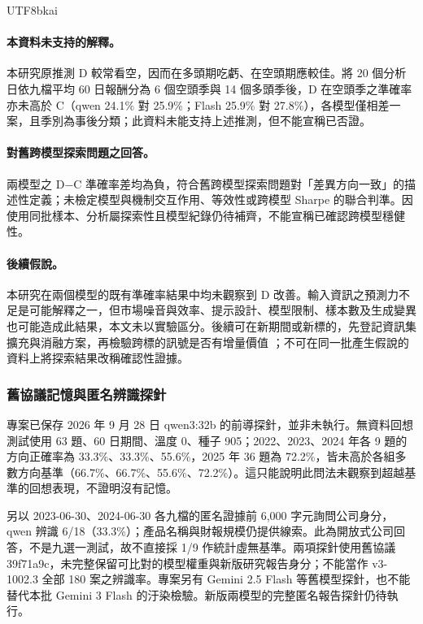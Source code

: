 \documentclass[12pt,a4paper]{article}
\newcommand{\grp}[1]{\textsf{#1}}
\begin{document}
\begin{CJK}{UTF8}{bkai}
\paragraph{本資料未支持的解釋。} 本研究原推測 \grp{D} 較常看空，因而在多頭期吃虧、在空頭期應較佳。將 20 個分析日依九檔平均 60 日報酬分為 6 個空頭季與 14 個多頭季後，\grp{D} 在空頭季之準確率亦未高於 \grp{C}（qwen 24.1\% 對 25.9\%；Flash 25.9\% 對 27.8\%），各模型僅相差一案，且季別為事後分類；此資料未能支持上述推測，但不能宣稱已否證。

\paragraph{對舊跨模型探索問題之回答。} 兩模型之 \grp{D}$-$\grp{C} 準確率差均為負，符合舊跨模型探索問題對「差異方向一致」的描述性定義；未檢定模型與機制交互作用、等效性或跨模型 Sharpe 的聯合判準。因使用同批樣本、分析屬探索性且模型紀錄仍待補齊，不能宣稱已確認跨模型穩健性。

\paragraph{後續假說。} 本研究在兩個模型的既有準確率結果中均未觀察到 \grp{D} 改善。輸入資訊之預測力不足是可能解釋之一，但市場噪音與效率、提示設計、模型限制、樣本數及生成變異也可能造成此結果，本文未以實驗區分。後續可在新期間或新標的，先登記資訊集擴充與消融方案，再檢驗跨標的訊號是否有增量價值 \citep{nosek2018prereg}；不可在同一批產生假說的資料上將探索結果改稱確認性證據。
\subsubsection{舊協議記憶與匿名辨識探針}
\label{sec:memorydiagnostic}

專案已保存 2026 年 9 月 28 日 qwen3:32b 的前導探針，並非未執行。無資料回想測試使用 63 題、60 日期間、溫度 0、種子 905；2022、2023、2024 年各 9 題的方向正確率為 33.3\%、33.3\%、55.6\%，2025 年 36 題為 72.2\%，皆未高於各組多數方向基準（66.7\%、66.7\%、55.6\%、72.2\%）。這只能說明此問法未觀察到超越基準的回想表現，不證明沒有記憶。

另以 2023-06-30、2024-06-30 各九檔的匿名證據前 6,000 字元詢問公司身分，qwen 辨識 6/18（33.3\%）；產品名稱與財報規模仍提供線索。此為開放式公司回答，不是九選一測試，故不直接採 1/9 作統計虛無基準。兩項探針使用舊協議 39f71a9c，未完整保留可比對的模型權重與新版研究報告身分；不能當作 v3-1002.3 全部 180 案之辨識率。專案另有 Gemini 2.5 Flash 等舊模型探針，也不能替代本批 Gemini 3 Flash 的汙染檢驗。新版兩模型的完整匿名報告探針仍待執行。

\end{CJK}
\end{document}
